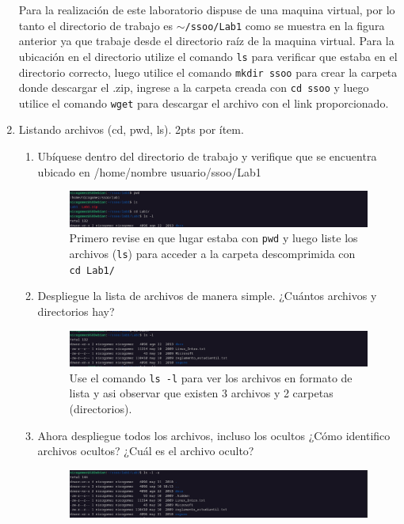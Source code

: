 \documentclass{templateNote}
\begin{document}
\begin{enumerate}
    Para la realización de este laboratorio dispuse de una maquina virtual, por lo tanto el directorio de trabajo es \texttt{$\sim$/ssoo/Lab1} como se muestra en la figura anterior ya que trabaje desde el directorio raíz de la maquina virtual.
    Para la ubicación en el directorio utilize el comando \texttt{ls} para verificar que estaba en el directorio correcto, luego utilice el comando \texttt{mkdir ssoo} para crear la carpeta donde descargar el .zip, ingrese a la carpeta creada con \texttt{cd ssoo} y luego utilice el comando \texttt{wget} para descargar el archivo con el link proporcionado.
    \item Listando archivos (cd, pwd, ls). 2pts por ítem.
    \begin{enumerate}[label=\alph*)]
        \item Ubíquese dentro del directorio de trabajo y verifique que se encuentra ubicado en /home/nombre usuario/ssoo/Lab1
        \begin{figure}[H]
            \centering
            \includegraphics[width=\textwidth]{img/ejerc2a.png}
            Primero revise en que lugar estaba con \texttt{pwd} y luego liste los archivos (\texttt{ls}) para acceder a la carpeta descomprimida con \texttt{cd Lab1/}
        \end{figure}
        \item Despliegue la lista de archivos de manera simple. ¿Cuántos archivos y directorios hay?
        \begin{figure}[H]
            \centering
            \includegraphics[width=\textwidth]{img/ejerc2b.png}
            Use el comando \texttt{ls -l} para ver los archivos en formato de lista y asi observar que existen 3 archivos y 2 carpetas (directorios).
        \end{figure}
        \item Ahora despliegue todos los archivos, incluso los ocultos ¿Cómo identifico archivos ocultos? ¿Cuál es el archivo oculto?
        \begin{figure}[H]
            \centering
            \includegraphics[width=\textwidth]{img/ejerc2c.png}

\end{figure}
\end{enumerate}
\end{enumerate}
\end{document}
